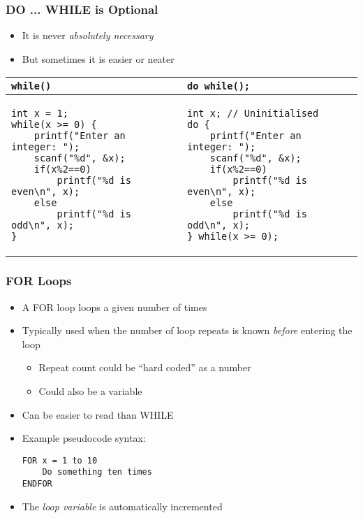 \documentclass[14pt]{beamer}
\begin{document}
\begin{frame}[fragile]
\frametitle{DO ... WHILE is Optional}
\begin{itemize}
	\item It is never \textit{absolutely necessary}
	\item But sometimes it is easier or neater
\end{itemize}
\vspace{-5mm}
\begin{table}[H]
\centering

\begin{tabular}{ll}
\texttt{while()} & \texttt{do while();} \\
\hline

\begin{lstlisting}[style=Ctable,basicstyle=\ttfamily\scriptsize]
int x = 1;
while(x >= 0) {
	printf("Enter an integer: ");
	scanf("%d", &x);
	if(x%2==0)
		printf("%d is even\n", x);
	else
		printf("%d is odd\n", x);
}
\end{lstlisting} &

\begin{lstlisting}[style=Ctable,basicstyle=\ttfamily\scriptsize]
int x; // Uninitialised
do {
	printf("Enter an integer: ");
	scanf("%d", &x);
	if(x%2==0)
		printf("%d is even\n", x);
	else
		printf("%d is odd\n", x);
} while(x >= 0);
\end{lstlisting}
\\

\hline
\end{tabular}
\end{table}

\end{frame}


\begin{frame}[fragile]
\frametitle{FOR Loops}
\begin{itemize}
\item A FOR loop loops a given number of times
\item Typically used when the number of loop repeats is known \textit{before} entering the loop
	\begin{itemize}
		\item Repeat count could be ``hard coded'' as a number
		\item Could also be a variable
	\end{itemize}
\item Can be easier to read than WHILE
\item Example pseudocode syntax:
\begin{lstlisting}[style=pseudo]
FOR x = 1 to 10
	Do something ten times
ENDFOR
\end{lstlisting}
\item The \textit{loop variable} is automatically incremented
\end{itemize}
\end{frame}
\end{document}
